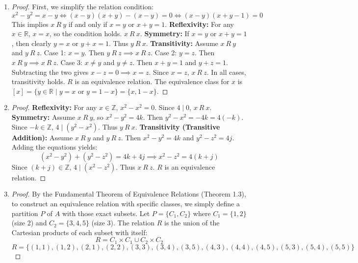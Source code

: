 \documentclass[11pt, a4paper]{article}
\theoremstyle{definition}
\theoremstyle{remark}
\newcommand{\R}{\mathbb{R}}
\newcommand{\Z}{\mathbb{Z}}
\begin{document}
\begin{enumerate}[label=\textbf{\arabic*.}, leftmargin=*]
    \item \begin{proof}
    First, we simplify the relation condition:
    \[ x^2 - y^2 = x - y \iff (x - y)(x + y) - (x - y) = 0 \iff (x - y)(x + y - 1) = 0 \]
    This implies $x \ R \ y$ if and only if $x = y$ or $x + y = 1$.
    \textbf{Reflexivity:} For any $x \in \R$, $x = x$, so the condition holds. $x \ R \ x$.
    \textbf{Symmetry:} If $x = y$ or $x + y = 1$, then clearly $y = x$ or $y + x = 1$. Thus $y \ R \ x$.
    \textbf{Transitivity:} Assume $x \ R \ y$ and $y \ R \ z$. 
    Case 1: $x = y$. Then $y \ R \ z \implies x \ R \ z$.
    Case 2: $y = z$. Then $x \ R \ y \implies x \ R \ z$.
    Case 3: $x \neq y$ and $y \neq z$. Then $x + y = 1$ and $y + z = 1$. Subtracting the two gives $x - z = 0 \implies x = z$. Since $x = z$, $x \ R \ z$.
    In all cases, transitivity holds. $R$ is an equivalence relation.
    The equivalence class for $x$ is $[x] = \{y \in \R \mid y = x \text{ or } y = 1 - x\} = \{x, 1 - x\}$.
    \end{proof}

    \item \begin{proof}
    \textbf{Reflexivity:} For any $x \in \Z$, $x^2 - x^2 = 0$. Since $4 \mid 0$, $x \ R \ x$.
    \textbf{Symmetry:} Assume $x \ R \ y$, so $x^2 - y^2 = 4k$. Then $y^2 - x^2 = -4k = 4(-k)$. Since $-k \in \Z$, $4 \mid (y^2 - x^2)$. Thus $y \ R \ x$.
    \textbf{Transitivity (Transitive Addition):} Assume $x \ R \ y$ and $y \ R \ z$. Then $x^2 - y^2 = 4k$ and $y^2 - z^2 = 4j$. Adding the equations yields:
    \[ (x^2 - y^2) + (y^2 - z^2) = 4k + 4j \implies x^2 - z^2 = 4(k + j) \]
    Since $(k + j) \in \Z$, $4 \mid (x^2 - z^2)$. Thus $x \ R \ z$. $R$ is an equivalence relation.
    \end{proof}

    \item \begin{proof}
    By the Fundamental Theorem of Equivalence Relations (Theorem 1.3), to construct an equivalence relation with specific classes, we simply define a partition $P$ of $A$ with those exact subsets.
    Let $P = \{C_1, C_2\}$ where $C_1 = \{1, 2\}$ (size 2) and $C_2 = \{3, 4, 5\}$ (size 3).
    The relation $R$ is the union of the Cartesian products of each subset with itself:
    \[ R = C_1 \times C_1 \cup C_2 \times C_2 \]
    \[ R = \{(1,1), (1,2), (2,1), (2,2), (3,3), (3,4), (3,5), (4,3), (4,4), (4,5), (5,3), (5,4), (5,5)\} \]
    

\end{proof}
\end{enumerate}
\end{document}
